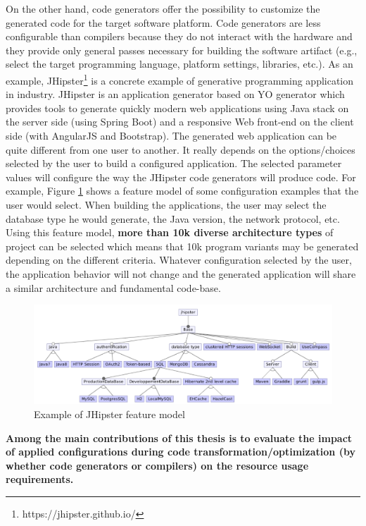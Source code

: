 On the other hand, code generators offer the possibility to customize the generated code for the target software platform. Code generators are less configurable than compilers because they do not interact with the hardware and they provide only general passes necessary for building the software artifact (e.g., select the target programming language, platform settings, libraries, etc.).
As an example, JHipster\footnote{https://jhipster.github.io/} is a concrete example of generative programming application in industry. JHipster is an application generator based on YO generator which provides tools to generate quickly modern web applications using Java stack on the server side (using Spring Boot) and a responsive Web front-end on the client side (with AngularJS and Bootstrap).
The generated web application can be quite different from one user to another. It really depends on the options/choices selected by the user to build a configured application. The selected parameter values will configure the way the JHipster code generators will produce code. 
For example, Figure \ref{fig:jhipster} shows a feature model of some configuration examples that the user would select. When building the applications, the user may select the database type he would generate, the Java version, the network protocol, etc. 
Using this feature model, \textbf{more than 10k diverse architecture types} of project can be selected which means that 10k program variants may be generated depending on the different criteria.
Whatever configuration selected by the user, the application behavior will not change and the generated application will share a similar architecture and fundamental code-base.
\begin{figure}[h]
	\center
	\includegraphics[scale=0.65]{Background/fig/jhipster}
	\caption{Example of JHipster feature model}
	\label{fig:jhipster}
\end{figure}
\textbf{Among the main contributions of this thesis is to evaluate the impact of applied configurations during code transformation/optimization (by whether code generators or compilers) on the resource usage requirements. 
}

